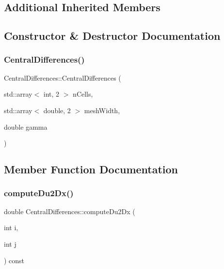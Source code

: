 \subsection*{Additional Inherited Members}


\subsection{Constructor \& Destructor Documentation}
\mbox{\label{classCentralDifferences_ac09fd44ef6658391ce08309f99774272}} 
\subsubsection{\texorpdfstring{CentralDifferences()}{CentralDifferences()}}
{\footnotesize\ttfamily Central\+Differences\+::\+Central\+Differences (\begin{DoxyParamCaption}\item[{std\+::array$<$ int, 2 $>$}]{n\+Cells,  }\item[{std\+::array$<$ double, 2 $>$}]{mesh\+Width,  }\item[{double}]{gamma }\end{DoxyParamCaption})}



\subsection{Member Function Documentation}
\mbox{\label{classCentralDifferences_abd31168fd39ed2d61f3459a9aa030204}} 
\subsubsection{\texorpdfstring{computeDu2Dx()}{computeDu2Dx()}}
{\footnotesize\ttfamily double Central\+Differences\+::compute\+Du2\+Dx (\begin{DoxyParamCaption}\item[{int}]{i,  }\item[{int}]{j }\end{DoxyParamCaption}) const\hspace{0.3cm}{\ttfamily [virtual]}}



